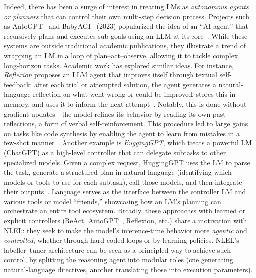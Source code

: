 \documentclass{article}
\theoremstyle{plain}
\theoremstyle{definition}
\theoremstyle{remark}
\begin{document}
Indeed, there has been a surge of interest in treating LMs as \emph{autonomous agents or planners} that can control their own multi-step decision process. Projects such as AutoGPT~\cite{autogpt2023} and BabyAGI~\cite{babyagi2023} (2023) popularized the idea of an ``AI agent'' that recursively plans and executes sub-goals using an LLM at its core~\cite{shen2023hugginggpt}. While these systems are outside traditional academic publications, they illustrate a trend of wrapping an LM in a loop of plan–act–observe, allowing it to tackle complex, long-horizon tasks. Academic work has explored similar ideas. For instance, \emph{Reflexion} proposes an LLM agent that improves itself through textual self-feedback: after each trial or attempted solution, the agent generates a natural-language reflection on what went wrong or could be improved, stores this in memory, and uses it to inform the next attempt~\cite{shinn2023reflexion}. Notably, this is done without gradient updates—the model refines its behavior by reading its own past reflections, a form of verbal self-reinforcement. This procedure led to large gains on tasks like code synthesis by enabling the agent to learn from mistakes in a few-shot manner~\cite{shinn2023reflexion}. Another example is \emph{HuggingGPT}, which treats a powerful LM (ChatGPT) as a high-level controller that can delegate subtasks to other specialized models. Given a complex request, HuggingGPT uses the LM to parse the task, generate a structured plan in natural language (identifying which models or tools to use for each subtask), call those models, and then integrate their outputs~\cite{shen2023hugginggpt}. Language serves as the interface between the controller LM and various tools or model ``friends,'' showcasing how an LM’s planning can orchestrate an entire tool ecosystem. Broadly, these approaches with learned or explicit controllers (ReAct, AutoGPT~\cite{autogpt2023}, Reflexion, etc.) share a motivation with NLEL: they seek to make the model’s inference-time behavior more \emph{agentic} and \emph{controlled}, whether through hard-coded loops or by learning policies. NLEL’s labeller–tuner architecture can be seen as a principled way to achieve such control, by splitting the reasoning agent into modular roles (one generating natural-language directives, another translating those into execution parameters).
\end{document}
